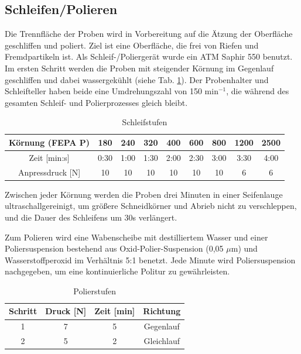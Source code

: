 \subsection{Schleifen/Polieren}

Die Trennfläche der Proben wird in Vorbereitung auf die Ätzung der Oberfläche geschliffen und poliert. Ziel ist eine Oberfläche, die frei von Riefen und Fremdpartikeln ist. Als Schleif-/Poliergerät wurde ein ATM Saphir 550 benutzt.
Im ersten Schritt werden die Proben mit steigender Körnung im Gegenlauf geschliffen und dabei wassergekühlt (siehe Tab. \ref{tab:Schleifstufen}). Der Probenhalter und Schleifteller haben beide eine Umdrehungszahl von 150 min$^{-1}$, die während des gesamten Schleif- und Polierprozesses gleich bleibt.   

\begin{table}[]
	\centering
	\begin{tabular}{|c|c|c|c|c|c|c|c|c|}
		
		\hline 
		Körnung (FEPA P) & 180 & 240 & 320 & 400 & 600 & 800 & 1200 & 2500 \\ 
		\hline 
		Zeit [min:s] & 0:30 & 1:00 & 1:30 & 2:00 & 2:30 & 3:00 & 3:30 & 4:00 \\ 
		\hline 
		Anpressdruck [N] & 10&10&10&10&10&10&6&6\\
		\hline
	\end{tabular} 
	\caption{Schleifstufen}
	\label{tab:Schleifstufen}
\end{table}

Zwischen jeder Körnung werden die Proben drei Minuten in einer Seifenlauge ultraschallgereinigt, um größere Schneidkörner und Abrieb nicht zu verschleppen, und die Dauer des Schleifens um 30s verlängert. 

Zum Polieren wird eine Wabenscheibe mit destilliertem Wasser und einer Poliersuspension bestehend aus Oxid-Polier-Suspension (0,05 \textup{$\mu$}m) und Wasserstoffperoxid im Verhältnis 5:1 benetzt. Jede Minute wird Poliersuspension nachgegeben, um eine kontinuierliche Politur zu gewährleisten.

\begin{table}[h]
	\centering
	
	\begin{tabular}{|c|c|c|c|}
		\hline 
		Schritt & Druck [N] & Zeit [min] & Richtung \\ 
		\hline 
		1 & 7 & 5 & Gegenlauf \\ 
		\hline 
		2 & 5 & 2 & Gleichlauf \\ 
		\hline 
	\end{tabular} 
	\caption{Polierstufen}
	\label{tab:Polierstufen}
\end{table}


